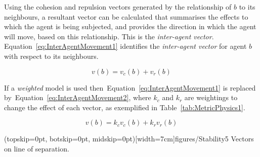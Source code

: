 \documentclass{ieeeaccess}
\begin{document}
Using the cohesion and repulsion vectors generated by the relationship of $b$
to its neighbours, a resultant vector can be calculated that summarises the
effects to which the agent is being subjected, and provides the direction in
which the agent will move, based on this relationship. This is the
\textit{inter-agent vector}.  Equation~\ref{eq:InterAgentMovement1} identifies
the \textit{inter-agent vector} for agent $b$ with respect to its neighbours.

\begin{equation}\label{eq:InterAgentMovement1}
v(b) = v_{c}(b) + v_{r}(b)
\end{equation}

If a \textit{weighted} model is used then~Equation~\ref{eq:InterAgentMovement1}
is replaced by~Equation~\ref{eq:InterAgentMovement2}, where $k_c$ and $k_r$ are
weightings to change the effect of each vector, as exemplified in
Table~\ref{tab:MetricPhysics1}.

\begin{equation}\label{eq:InterAgentMovement2}
v(b) = k_cv_{c}(b) + k_rv_{r}(b)
\end{equation}


\Figure[t!](topskip=0pt, botskip=0pt, midskip=0pt)[width=7cm]{figures/Stability5}
{Vectors on line of separation.\label{methods:Stability5}}

\end{document}
